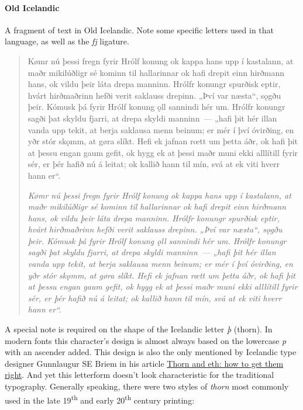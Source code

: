 \documentclass[12pt,a4paper,openany]{book}
\begin{document}
\paragraph{Old Icelandic}

A fragment of text in Old Icelandic. Note some specific letters used in
that language, as well as the \textit{fj} ligature.

\begin{quote}
\large

Kømr nú þessi fregn fyrir Hrólf konung ok kappa hans upp í kastalann, at
maðr mikilúðligr sé kominn til hallarinnar ok hafi drepit einn hirðmann
hans, ok vildu þeir láta drepa manninn. Hrólfr konungr spurðisk eptir,
hvárt hirðmaðrinn hefði verit saklauss drepinn. „Því var næsta“, sǫgðu
þeir. Kómusk þá fyrir Hrólf konung ǫll sannindi hér um. Hrólfr konungr
sagði þat skyldu fjarri, at drepa skyldi manninn~— „hafi þit hér illan
vanda upp tekit, at berja saklausa menn beinum; er mér í því óvirðing, en
yðr stór skǫmm, at gøra slíkt. Hefi ek jafnan rœtt um þetta áðr, ok hafi
þit at þessu engan gaum gefit, ok hygg ek at þessi maðr muni ekki alllítill
fyrir sér, er þér hafið nú á leitat; ok kallið hann til mín, svá at ek viti
hverr hann er“.

\smallskip

\itshape
Kømr nú þessi fregn fyrir Hrólf konung ok kappa hans upp í kastalann, at
maðr mikilúðligr sé kominn til hallarinnar ok hafi drepit einn hirðmann
hans, ok vildu þeir láta drepa manninn. Hrólfr konungr spurðisk eptir,
hvárt hirðmaðrinn hefði verit saklauss drepinn. „Því var næsta“, sǫgðu
þeir. Kómusk þá fyrir Hrólf konung ǫll sannindi hér um. Hrólfr konungr
sagði þat skyldu fjarri, at drepa skyldi manninn~— „hafi þit hér illan
vanda upp tekit, at berja saklausa menn beinum; er mér í því óvirðing, en
yðr stór skǫmm, at gøra slíkt. Hefi ek jafnan rœtt um þetta áðr, ok hafi
þit at þessu engan gaum gefit, ok hygg ek at þessi maðr muni ekki alllítill
fyrir sér, er þér hafið nú á leitat; ok kallið hann til mín, svá at ek viti
hverr hann er“.

\end{quote}

A special note is required on the shape of the Icelandic letter \textit{þ}
(thorn). In modern fonts this character’s design is almost always based on
the lowercase \textit{p} with an ascender added. This design is also the
only mentioned by Icelandic type designer Gunnlaugur SE Briem in his
article \href{http://briem.ismennt.is/2/2.11/index.htm}{Thorn and eth: how
to get them right}. And yet this letterform doesn’t look characteristic for
the traditional typography. Generally speaking, there were two styles of
\textit{thorn} most commonly used in the late 19\textsuperscript{th} and
early 20\textsuperscript{th} century printing:
\end{document}
